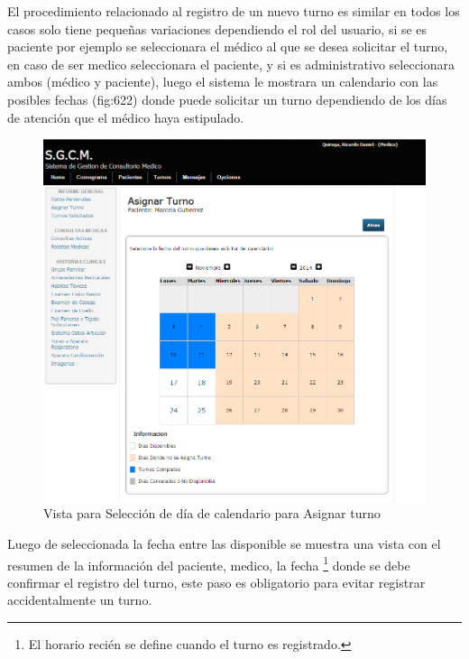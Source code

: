 El procedimiento relacionado al registro de un nuevo turno es similar en todos los casos solo tiene pequeñas variaciones dependiendo el rol del usuario, si se es paciente por ejemplo se seleccionara el médico al que se desea solicitar el turno, en caso de ser medico seleccionara el paciente, y si es administrativo seleccionara ambos (médico y paciente), luego el sistema le mostrara un calendario con las posibles fechas (fig:622) donde puede solicitar un turno dependiendo de los días de atención que el médico haya estipulado.

\begin{figure}[H]
    \centering
    \includegraphics[scale=0.5]{resourse/calendario.png}
    \caption{Vista para Selección de día de calendario para Asignar turno}
    \label{fig:622}
\end{figure}

Luego de seleccionada la fecha entre las disponible se muestra una vista con el resumen de la información del paciente, medico, la fecha \footnote{El horario recién se define cuando el turno es registrado.} donde se debe confirmar el registro del turno, este paso es obligatorio para evitar registrar accidentalmente un turno.

